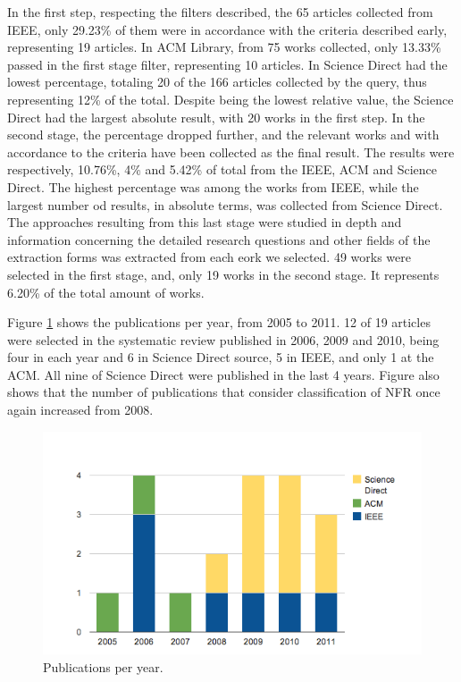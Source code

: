 In the first step, respecting the filters described, the 65 articles collected
from IEEE, only 29.23\% of them were in accordance with the criteria
described early, representing 19 articles. In ACM Library, from 75 works
collected, only 13.33\% passed in the first stage filter, representing 10 articles. In Science Direct
had the lowest percentage, totaling 20 of the 166 articles collected by the
query, thus representing 12\% of the total. Despite being the lowest relative
value, the Science Direct had the largest absolute result, with 20 works
in the first step. In the second stage, the percentage dropped further, and the
relevant works and with accordance to the criteria have been collected as the
final result. The results were respectively, 10.76\%, 4\% and 5.42\% of total
from the IEEE, ACM and Science Direct. The highest percentage was among the
 works from  IEEE, while the largest number od results, in absolute terms,
 was collected from Science Direct. The approaches resulting from this last
 stage were studied in depth and information concerning the detailed research
 questions and other fields of the extraction forms was extracted from each
 eork we selected. 49 works were selected in the first stage, and, only 19
 works in the second stage. It represents  6.20\% of the total amount of works.

Figure \ref{fig:statistics} shows the publications per year, from
2005 to 2011. 12 of 19 articles were selected in the systematic review published
in 2006, 2009 and 2010, being four in each year and 6 in Science Direct source,
5 in IEEE, and only 1 at the ACM. All nine of Science Direct were
published in the last 4 years. Figure also
shows that the number of publications that consider classification of NFR once
again increased from 2008. 

\begin{figure} 
\centering
\includegraphics[width=.6\textwidth]{chapters/state_ofthe_art/figs/data.png}
\caption{Publications per year.}
\label{fig:statistics}
\end{figure} 


